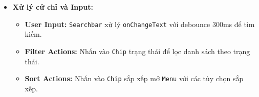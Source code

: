 \begin{itemize}
\begin{itemize}
\begin{itemize}
\begin{itemize}
                            \item \texttt{Text.userEmail}: Email với icon \texttt{email}.
                            \item \texttt{Text.userPhone}: Số điện thoại với icon \texttt{phone}.
                            \item \texttt{Text.registeredDate}: Ngày đăng ký với icon \texttt{calendar}.
                        \end{itemize}
                    \item \texttt{Chip.statusChip}: Badge trạng thái (Hoạt động/Bị khóa):
                        \begin{itemize}
                            \item Màu xanh lá (\texttt{\#4CAF50}) - Hoạt động
                            \item Màu đỏ (\texttt{\#F44336}) - Bị khóa
                        \end{itemize}
                    \item \texttt{View.actionsRow}: Hàng các nút hành động:
                        \begin{itemize}
                            \item \texttt{IconButton.view}: Icon \texttt{eye} để xem chi tiết.
                            \item \texttt{IconButton.lock}: Icon \texttt{lock}/\texttt{lock-open} để khóa/mở khóa.
                            \item \texttt{IconButton.delete}: Icon \texttt{delete} để xóa tài khoản.
                        \end{itemize}
                \end{itemize}
            \item \texttt{Portal} $\rightarrow$ \texttt{Dialog.confirmDialog}: Dialog xác nhận cho các hành động quan trọng.
            \item \texttt{BottomNavBar}: Tab ``admin'' đang active (chỉ hiện với QTV).
        \end{itemize}
    \item \textbf{Xử lý cử chỉ và Input:}
        \begin{itemize}
            \item \textbf{User Input:} \texttt{Searchbar} xử lý \texttt{onChangeText} với debounce 300ms để tìm kiếm.
            \item \textbf{Filter Actions:} Nhấn vào \texttt{Chip} trạng thái để lọc danh sách theo trạng thái.
            \item \textbf{Sort Actions:} Nhấn vào \texttt{Chip} sắp xếp mở \texttt{Menu} với các tùy chọn sắp xếp.

\end{itemize}
\end{itemize}
